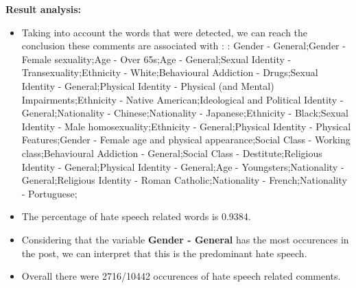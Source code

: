 \documentclass[11pt]{article}
\begin{document}
\textbf{\Large Result analysis:}

\begin{itemize}\item Taking into account the words that were detected, we can reach the conclusion these comments are associated with : : Gender - General;Gender - Female sexuality;Age - Over 65s;Age - General;Sexual Identity - Transexuality;Ethnicity - White;Behavioural Addiction - Drugs;Sexual Identity - General;Physical Identity - Physical (and Mental) Impairments;Ethnicity - Native American;Ideological and Political Identity - General;Nationality - Chinese;Nationality - Japanese;Ethnicity - Black;Sexual Identity - Male homosexuality;Ethnicity - General;Physical Identity - Physical Features;Gender - Female age and physical appearance;Social Class - Working class;Behavioural Addiction - General;Social Class - Destitute;Religious Identity - General;Physical Identity - General;Age - Youngsters;Nationality - General;Religious Identity - Roman Catholic;Nationality - French;Nationality - Portuguese;%

\item The percentage of hate speech related words is 0.9384.

\item Considering that the variable \textbf{Gender - General} has the most occurences in the post, we can interpret that this is the predominant hate speech.

\item Overall there were 2716/10442 occurences of hate speech related comments.\end{itemize}
\end{document}
